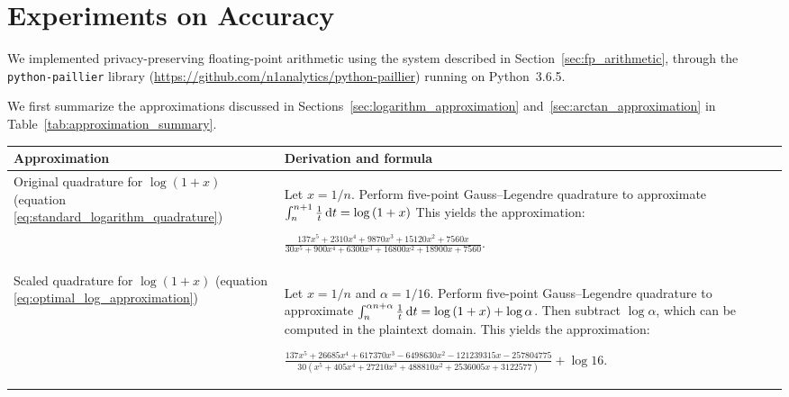 \section{Experiments on Accuracy}
We implemented privacy-preserving floating-point arithmetic using the system described in Section~\ref{sec:fp_arithmetic}, through the \texttt{python-paillier} library (\url{https://github.com/n1analytics/python-paillier}) running on Python~3.6.5.

We first summarize the approximations discussed in Sections~\ref{sec:logarithm_approximation} and~\ref{sec:arctan_approximation} in Table~\ref{tab:approximation_summary}.

\begin{table*}[ht]
	\caption{Summary of approximations for logarithm and inverse tangent}
	\label{tab:approximation_summary}
    \begin{tabular}{
        p{}
        p{}}
		\toprule
		Approximation & Derivation and formula\\
		\midrule
            Original quadrature for $\log\left(1+x\right)$ (equation \ref{eq:standard_logarithm_quadrature})
            & Let $x=1/n$. Perform five-point Gauss--Legendre quadrature to approximate $\int_{n}^{n+1}{\frac{1}{t}\mathop{}\!\mathrm{d} t} = \log\left(1+x\right)$ This yields the approximation:
            \begin{center}
                $\displaystyle 
            \frac{137x^5 + 2310x^4 + 9870x^3 + 15120x^2 + 7560x}
            {30x^5 + 900x^4 + 6300x^3 + 16800x^2 + 18900x + 7560}$.
            \end{center}
            \\[10pt]

            Scaled quadrature for $\log\left(1+x\right)$ (equation \ref{eq:optimal_log_approximation})
            & Let $x=1/n$ and $\alpha= 1/16$. Perform five-point Gauss--Legendre quadrature to approximate $\int_{n}^{\alpha n + \alpha}{\frac{1}{t}\mathop{}\!\mathrm{d} t} = \log\left(1+x\right) + \log\alpha$. 
            Then subtract $\log\alpha$, which can be computed in the plaintext domain. This yields the approximation:
            \begin{center}
            $\displaystyle 
            \frac{137x^5 + 26685x^4 + 617370x^3 - 6498630x^2 - 121239315x - 257804775}
            {30(x^5 + 405x^4 + 27210x^3 + 488810x^2 + 2536005x + 3122577)}
            + \log{16}$.
            \end{center}
            \\[10pt]
            

\end{tabular}
\end{table*}
